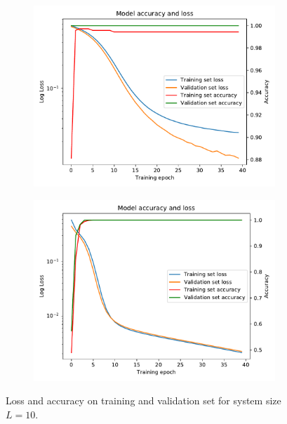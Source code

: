 \documentclass[reprint,amsmath,amssymb,aps,prb]{revtex4-2}
\begin{document}
\onecolumngrid
\begin{center}
	\begin{figure}[H]
		\centering	
		\begin{subfigure}[c]{0.45\textwidth}
			\includegraphics[width=\textwidth]{../results/accuracy_loss_epochs/N10n1_accuracy_loss_epochs.pdf}
		\end{subfigure}
		\begin{subfigure}[c]{0.45\textwidth}
			\includegraphics[width=\textwidth]{../results/accuracy_loss_epochs/N10n7_accuracy_loss_epochs.pdf}
		\end{subfigure}
		\caption{Loss and accuracy on training and validation set for system size $L=10$.}
		\label{fig:val_acc}
	\end{figure}
\end{center}
\twocolumngrid
\end{document}
